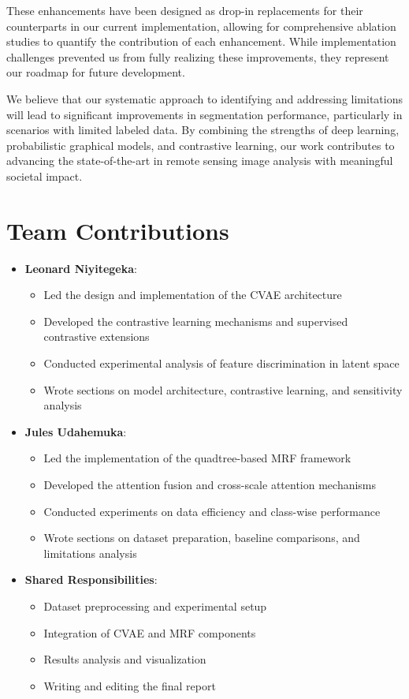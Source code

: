 \documentclass[conference]{IEEEtran}
\begin{document}
These enhancements have been designed as drop-in replacements for their counterparts in our current implementation, allowing for comprehensive ablation studies to quantify the contribution of each enhancement. While implementation challenges prevented us from fully realizing these improvements, they represent our roadmap for future development.

We believe that our systematic approach to identifying and addressing limitations will lead to significant improvements in segmentation performance, particularly in scenarios with limited labeled data. By combining the strengths of deep learning, probabilistic graphical models, and contrastive learning, our work contributes to advancing the state-of-the-art in remote sensing image analysis with meaningful societal impact.

\section*{Team Contributions}

\begin{itemize}
    \item \textbf{Leonard Niyitegeka}:
    \begin{itemize}
        \item Led the design and implementation of the CVAE architecture
        \item Developed the contrastive learning mechanisms and supervised contrastive extensions
        \item Conducted experimental analysis of feature discrimination in latent space
        \item Wrote sections on model architecture, contrastive learning, and sensitivity analysis
    \end{itemize}
    
    \item \textbf{Jules Udahemuka}:
    \begin{itemize}
        \item Led the implementation of the quadtree-based MRF framework
        \item Developed the attention fusion and cross-scale attention mechanisms
        \item Conducted experiments on data efficiency and class-wise performance
        \item Wrote sections on dataset preparation, baseline comparisons, and limitations analysis
    \end{itemize}
    
    \item \textbf{Shared Responsibilities}:
    \begin{itemize}
        \item Dataset preprocessing and experimental setup
        \item Integration of CVAE and MRF components
        \item Results analysis and visualization
        \item Writing and editing the final report
    \end{itemize}
\end{itemize}
\end{document}
